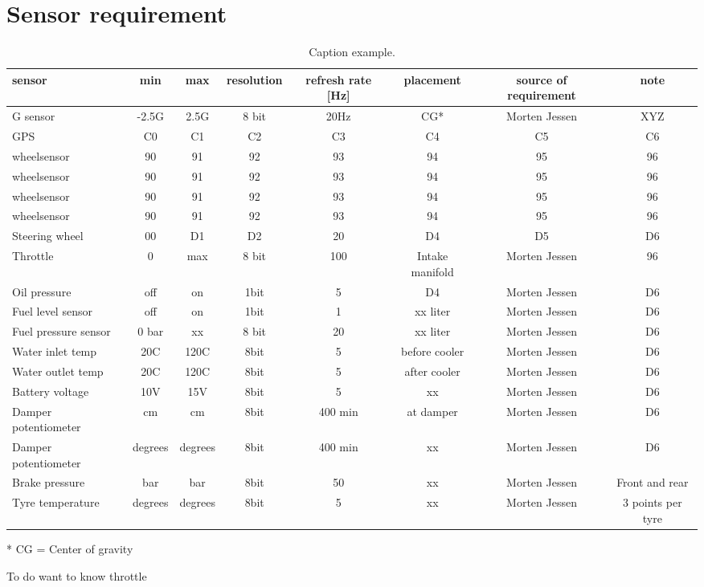 \chapter{Sensor requirement}

\begin{landscape}
\begin{table}[htbp]
\centering
\begin{tabular} {l @{}c @{}c @{}c @{}c @{}c @{}c @{}c@{}}
\toprule
sensor & min	& max 	& resolution 	& refresh rate [Hz]	& placement 	& source of requirement & note	\\
\midrule
G sensor 	& -2.5G	& 2.5G	& 8 bit	 & 20Hz & CG* & Morten Jessen & XYZ\\
GPS 	& C0	& C1	& C2	& C3	& C4	& C5	& C6 \\
wheelsensor & 90	& 91	& 92	& 93	& 94	& 95	& 96 \\
wheelsensor & 90	& 91	& 92	& 93	& 94	& 95	& 96 \\
wheelsensor & 90	& 91	& 92	& 93	& 94	& 95	& 96 \\
wheelsensor & 90	& 91	& 92	& 93	& 94	& 95	& 96 \\
Steering wheel & 00	& D1	& D2	& 20		& D4				& D5			& D6 \\
Throttle  		& 0	& max	& 8 bit	&  100	& Intake manifold 	& Morten Jessen	& 96  \\
Oil pressure & off	& on	& 1bit 	& 5		& D4				& Morten Jessen			& D6 \\
Fuel level sensor & off	& on	& 1bit 	& 1		&  xx liter			& Morten Jessen			& D6 \\
Fuel pressure sensor & 0 bar	& xx	& 8 bit 	& 20		&  xx liter			& Morten Jessen			& D6 \\
Water inlet temp & 20C	& 120C	& 8bit 	& 5		&  before cooler			& Morten Jessen			& D6 \\
Water outlet temp & 20C	& 120C	& 8bit 	& 5		&  after cooler			& Morten Jessen			& D6 \\
Battery voltage & 10V	& 15V	& 8bit 	& 5		&  xx			& Morten Jessen			& D6 \\
Damper potentiometer & cm	& cm	& 8bit 	& 400 min		&  at damper			& Morten Jessen			& D6 \\
Damper potentiometer & degrees	& degrees	& 8bit 	& 400 min		&  xx			& Morten Jessen			& D6 \\
Brake pressure & bar	& bar	& 8bit 	& 50		&  xx			& Morten Jessen			& Front and rear \\
Tyre temperature & degrees	& degrees	& 8bit 	& 5		&  xx			& Morten Jessen			& 3 points per tyre \\
\bottomrule
\end{tabular}
\caption{Caption example.}
\label{tab:label_example}
\end{table}

* CG = Center of gravity 

To do 
want to know throttle 

\end{landscape}

